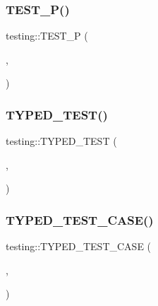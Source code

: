 \mbox{\label{namespacetesting_af05768b7e2f14652d2c4f274ba1a5544}} 
\subsubsection{\texorpdfstring{TEST\_P()}{TEST\_P()}}
{\footnotesize\ttfamily testing\+::\+T\+E\+S\+T\+\_\+P (\begin{DoxyParamCaption}\item[{\mbox{\hyperlink{classtesting_1_1_code_location_for_t_e_s_t_p}{Code\+Location\+For\+T\+E\+S\+TP}}}]{,  }\item[{Verify}]{ }\end{DoxyParamCaption})}

\mbox{\label{namespacetesting_a400c572f732b06e836d6b3a5adfc4cf7}} 
\subsubsection{\texorpdfstring{TYPED\_TEST()}{TYPED\_TEST()}}
{\footnotesize\ttfamily testing\+::\+T\+Y\+P\+E\+D\+\_\+\+T\+E\+ST (\begin{DoxyParamCaption}\item[{\mbox{\hyperlink{classtesting_1_1_code_location_for_t_y_p_e_d_t_e_s_t}{Code\+Location\+For\+T\+Y\+P\+E\+D\+T\+E\+ST}}}]{,  }\item[{Verify}]{ }\end{DoxyParamCaption})}

\mbox{\label{namespacetesting_af0459cc6cdfbbae821caf802c7f2bb72}} 
\subsubsection{\texorpdfstring{TYPED\_TEST\_CASE()}{TYPED\_TEST\_CASE()}}
{\footnotesize\ttfamily testing\+::\+T\+Y\+P\+E\+D\+\_\+\+T\+E\+S\+T\+\_\+\+C\+A\+SE (\begin{DoxyParamCaption}\item[{\mbox{\hyperlink{classtesting_1_1_code_location_for_t_y_p_e_d_t_e_s_t}{Code\+Location\+For\+T\+Y\+P\+E\+D\+T\+E\+ST}}}]{,  }\item[{int}]{ }\end{DoxyParamCaption})}

